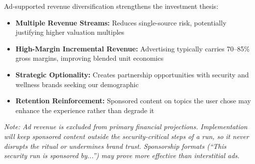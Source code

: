 Ad-supported revenue diversification strengthens the investment thesis:

\begin{itemize}
  \item \textbf{Multiple Revenue Streams:} Reduces single-source risk, potentially justifying higher valuation multiples
  \item \textbf{High-Margin Incremental Revenue:} Advertising typically carries 70--85\% gross margins, improving blended unit economics
  \item \textbf{Strategic Optionality:} Creates partnership opportunities with security and wellness brands seeking our demographic
  \item \textbf{Retention Reinforcement:} Sponsored content on topics the user chose may enhance the experience rather than degrade it
\end{itemize}

\noindent\textit{Note: Ad revenue is excluded from primary financial projections. Implementation will keep sponsored content outside the security-critical steps of a run, so it never disrupts the ritual or undermines brand trust. Sponsorship formats (``This security run is sponsored by...'') may prove more effective than interstitial ads.}
